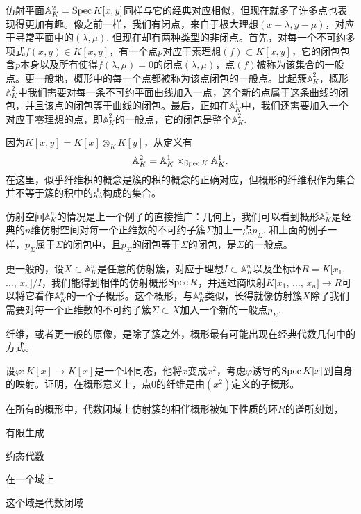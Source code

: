 
仿射平面$\mathbb{A}^2_K=\operatorname{Spec} K[x,y]$同样与它的经典对应相似，但现在就多了许多点也表现得更加有趣。像之前一样，我们有闭点，来自于极大理想$(x-\lambda,y-\mu)$，对应于寻常平面中的$(\lambda,\mu)$. 但现在却有两种类型的非闭点。首先，对每一个不可约多项式$f(x,y)\in K[x,y]$，有一个点$p$对应于素理想$(f)\subset K[x,y]$，它的闭包包含$p$本身以及所有使得$f(\lambda,\mu)=0$的闭点$(\lambda,\mu)$，点$(f)$被称为该集合的一般点。更一般地，概形中的每一个点都被称为该点闭包的一般点。比起簇$\mathbb{A}^2_K$，概形$\mathbb{A}^2_K$中我们需要对每一条不可约平面曲线加入一点，这个新的点属于这条曲线的闭包，并且该点的闭包等于曲线的闭包。最后，正如在$\mathbb{A}^1_K$中，我们还需要加入一个对应于零理想的点，即$\mathbb{A}^2_K$的一般点，它的闭包是整个$\mathbb{A}^2_K$.


因为$K[x,y]=K[x]\otimes_K K[y]$，从定义有
\[
	\mathbb{A}^2_K=\mathbb{A}^1_K\times_{\operatorname{Spec} K}\mathbb{A}^1_K.
\]
在这里，似乎纤维积的概念是簇的积的概念的正确对应，但概形的纤维积作为集合并不等于簇的积中的点构成的集合。

仿射空间$\mathbb{A}^n_K$的情况是上一个例子的直接推广：几何上，我们可以看到概形$\mathbb{A}^n_K$是经典的$n$维仿射空间对每一个正维数的不可约子簇$\Sigma$加上一点$p_\Sigma$. 和上面的例子一样，$p_\Sigma$属于$\Sigma$的闭包中，且$p_\Sigma$的闭包等于$\Sigma$的闭包，是$\Sigma$的一般点。

更一般的，设$X\subset \mathbb{A}^n_K$是任意的仿射簇，对应于理想$I\subset \mathbb{A}^n_K$以及坐标环$R=K[x_1$, $\dots$, $x_n]/I$，我们能得到相伴的仿射概形$\operatorname{Spec} R$，并通过商映射$K[x_1$, $\dots$, $x_n]\to R$可以将它看作$\mathbb{A}^n_K$的一个子概形。这个概形，与$\mathbb{A}^n_K$类似，长得就像仿射簇$X$除了我们需要对每一个正维数的不可约子簇$\Sigma\subset X$加入一个新的一般点$p_\Sigma$.

纤维，或者更一般的原像，是除了簇之外，概形最有可能出现在经典代数几何中的方式。

\begin{exe} \label{exe.2.2}
设$\varphi:K[x]\to K[x]$是一个环同态，他将$x$变成$x^2$，考虑$\varphi$诱导的$\operatorname{Spec} K[x]$到自身的映射。证明，在概形意义上，点$0$的纤维是由$(x^2)$定义的子概形。

\end{exe}

在所有的概形中，代数闭域上仿射簇的相伴概形被如下性质的环$R$的谱所刻划，
\begin{compactitem}[~~~--]
\item 有限生成
\item 约态代数
\item 在一个域上
\item 这个域是代数闭域
\end{compactitem}

